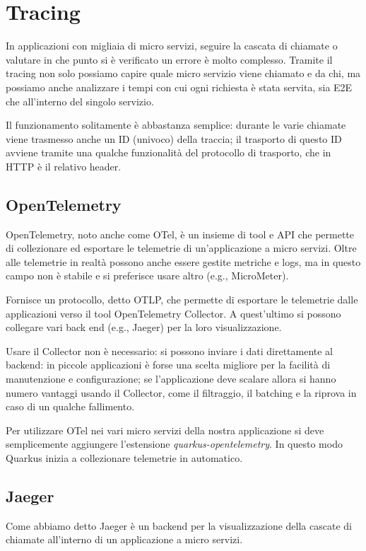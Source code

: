 \chapter{Tracing}
\label{cap:tracing}
In applicazioni con migliaia di micro servizi, seguire la cascata di chiamate o valutare in che punto si è verificato un errore è molto complesso. Tramite il tracing non solo possiamo capire quale micro servizio viene chiamato e da chi, ma possiamo anche analizzare i tempi con cui ogni richiesta è stata servita, sia E2E che all'interno del singolo servizio.

Il funzionamento solitamente è abbastanza semplice: durante le varie chiamate viene trasmesso anche un ID (univoco) della traccia; il trasporto di questo ID avviene tramite una qualche funzionalità del protocollo di trasporto, che in HTTP è il relativo header.

\section{OpenTelemetry}
OpenTelemetry, noto anche come OTel, è un insieme di tool e API che permette di collezionare ed esportare le telemetrie di un'applicazione a micro servizi. Oltre alle telemetrie in realtà possono anche essere gestite metriche e logs, ma in questo campo non è stabile e si preferisce usare altro (e.g., MicroMeter).

\myskip

Fornisce un protocollo, detto OTLP, che permette di esportare le telemetrie dalle applicazioni verso il tool OpenTelemetry Collector. A quest'ultimo si possono collegare vari back end (e.g., Jaeger) per la loro visualizzazione.

Usare il Collector non è necessario: si possono inviare i dati direttamente al backend: in piccole applicazioni è forse una scelta migliore per la facilità di manutenzione e configurazione; se l'applicazione deve scalare allora si hanno numero vantaggi usando il Collector, come il filtraggio, il batching e la riprova in caso di un qualche fallimento.

\myskip

Per utilizzare OTel nei vari micro servizi della nostra applicazione si deve semplicemente aggiungere l'estensione \textit{quarkus-opentelemetry}. In questo modo Quarkus inizia a collezionare telemetrie in automatico.

\section{Jaeger}
Come abbiamo detto Jaeger è un backend per la visualizzazione della cascate di chiamate all'interno di un applicazione a micro servizi.

